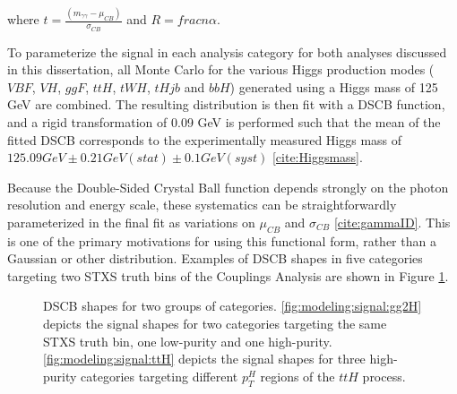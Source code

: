 where $t = \frac{(m_{\gamma \gamma} - \mu_{CB})}{\sigma_{CB}}$ and $R = frac{n}{\alpha}$. 

To parameterize the signal in each analysis category for both analyses discussed in this dissertation, all Monte Carlo for the various Higgs production modes ($VBF$, $VH$, $ggF$, $ttH$, $tWH$, $tHjb$ and $bbH$) generated using a Higgs mass of 125 GeV are combined. The resulting distribution is then fit with a DSCB function, and a rigid transformation of 0.09 GeV is performed such that the mean of the fitted DSCB corresponds to the experimentally measured Higgs mass of $125.09 GeV \pm 0.21 GeV(stat) \pm 0.1 GeV(syst)$ \ref{cite:Higgsmass}.

Because the Double-Sided Crystal Ball function depends strongly on the photon resolution and energy scale, these systematics can be straightforwardly parameterized in the final fit as variations on $\mu_{CB}$ and $\sigma_{CB}$ \ref{cite:gammaID}. This is one of the primary motivations for using this functional form, rather than a Gaussian or other distribution. Examples of DSCB shapes in five categories targeting two STXS truth bins of the Couplings Analysis are shown in Figure \ref{fig:DSCB}.

\begin{figure}[h]
\centering
{}
\caption{DSCB shapes for two groups of categories. \ref{fig:modeling:signal:gg2H} depicts the signal shapes for two categories targeting the same STXS truth bin, one low-purity and one high-purity. \ref{fig:modeling:signal:ttH} depicts the signal shapes for three high-purity categories targeting different $p_{T}^{H}$ regions of the $ttH$ process.}
\label{fig:DSCB}
\end{figure}

